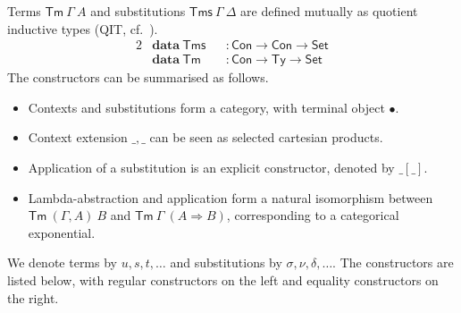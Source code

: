 \documentclass[a4paper,english,cleveref,autoref,draft]{lipics-v2019}
\newcommand{\agdaSymb}[1]{\mathsf{#1}}
\newcommand{\agdaKW}[1]{\mathbf{#1}}
\newcommand{\data}{\agdaKW{data}}
\newcommand{\Set}{\agdaSymb{Set}}
\newcommand{\Ty}{\agdaSymb{Ty}}
\newcommand{\Con}{\agdaSymb{Con}}
\newcommand{\Tms}{\agdaSymb{Tms}}
\newcommand{\Tm}{\agdaSymb{Tm}}
\newcommand{\Ra}{\Rightarrow}
\begin{document}
Terms $\Tm\ \Gamma\ A$ and substitutions $\Tms\ \Gamma\ \Delta$ are defined mutually
as quotient inductive types (QIT, cf.~\cite{kaposi2016type}).
\begin{alignat*}{2}
  & \data\ \Tms && : \Con \to \Con \to \Set \\
  & \data\ \Tm && : \Con \to \Ty \to \Set
\end{alignat*}
The constructors can be summarised as follows.
\begin{itemize}
\item Contexts and substitutions form a category, with terminal object $\bullet$.
\item Context extension $\_,\_$ can be seen as selected cartesian products.
\item Application of a substitution is an explicit constructor, denoted
  by $\_[\_]$.
\item Lambda-abstraction and application form a natural isomorphism
  between $\Tm\ (\Gamma , A)\ B$ and $\Tm\ \Gamma\ (A \Ra B)$,
  corresponding to a categorical exponential.
\end{itemize}
We denote terms by $u,s,t,\dots$ and substitutions by $\sigma,\nu,\delta,\dots$.
The constructors are listed below, with regular constructors on the left
and equality constructors on the right.
\end{document}
